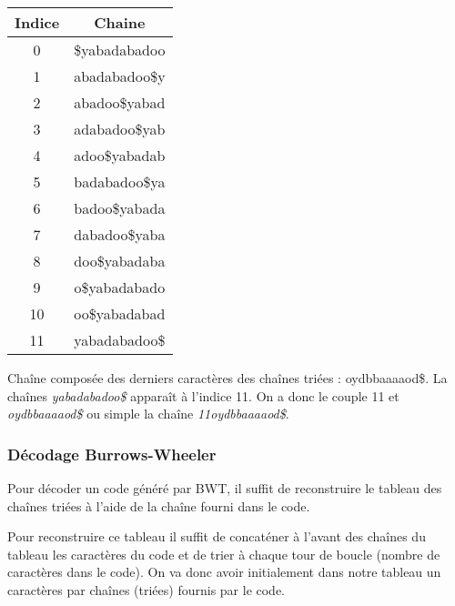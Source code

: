 

\begin{tabular}{|c|c|}
    \hline
    Indice & Chaine \\
    \hline
    0 & \$yabadabadoo\\
    \hline
    1 & abadabadoo\$y  \\
    \hline
    2 & abadoo\$yabad\\
    \hline
    3 & adabadoo\$yab\\
    \hline
    4 & adoo\$yabadab\\
    \hline
    5 & badabadoo\$ya\\
    \hline
    6 & badoo\$yabada\\
    \hline
    7 & dabadoo\$yaba\\
    \hline
    8 & doo\$yabadaba\\
    \hline
    9 & o\$yabadabado\\
    \hline
    10 & oo\$yabadabad\\
    \hline
    11 & yabadabadoo\$\\
    \hline
\end{tabular}


\par Chaîne composée des derniers caractères des chaînes triées : oydbbaaaaod\$.
La chaînes \textit{yabadabadoo\$} apparaît à l'indice 11. On a donc le couple 11 et \textit{oydbbaaaaod\$} ou  simple la chaîne \textit{11oydbbaaaaod\$}.

\subsubsection{Décodage Burrows-Wheeler}

\par Pour décoder un code généré par BWT, il suffit de reconstruire le tableau des chaînes triées à l'aide de la chaîne fourni dans le code.

\par Pour reconstruire ce tableau il suffit de concaténer à l'avant des chaînes du tableau les caractères du code et de trier à chaque tour de boucle (nombre de caractères dans le code). On va donc avoir initialement dans notre tableau un caractères par chaînes (triées) fournis par le code. 


